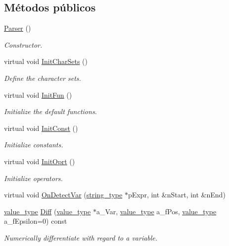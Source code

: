 \subsection*{Métodos públicos}
\begin{DoxyCompactItemize}
\item 
\hyperlink{classmu_1_1_parser_a76747bbf8c232e488e15f846e1b4ed34}{Parser} ()
\begin{DoxyCompactList}\small\item\em Constructor. \end{DoxyCompactList}\item 
virtual void \hyperlink{classmu_1_1_parser_a3279e2cf701ba8c2f850f5826a147f75}{Init\+Char\+Sets} ()
\begin{DoxyCompactList}\small\item\em Define the character sets. \end{DoxyCompactList}\item 
virtual void \hyperlink{classmu_1_1_parser_a9da582fd5385acfd97ec99a8790f8c6d}{Init\+Fun} ()
\begin{DoxyCompactList}\small\item\em Initialize the default functions. \end{DoxyCompactList}\item 
virtual void \hyperlink{classmu_1_1_parser_aefd1da7ba62d20d7276b1e70c8cb6a02}{Init\+Const} ()
\begin{DoxyCompactList}\small\item\em Initialize constants. \end{DoxyCompactList}\item 
virtual void \hyperlink{classmu_1_1_parser_a4ed9bdd0565bd57325bc49c12cf73e06}{Init\+Oprt} ()
\begin{DoxyCompactList}\small\item\em Initialize operators. \end{DoxyCompactList}\item 
virtual void \hyperlink{classmu_1_1_parser_a8e5afdde87b9f8acabde693441d4798c}{On\+Detect\+Var} (\hyperlink{namespacemu_ae9f8b44d9a97dd397180891e8390c3e9}{string\+\_\+type} $\ast$p\+Expr, int \&n\+Start, int \&n\+End)
\item 
\hyperlink{namespacemu_a17d4f113a4b88b8d971cca8ddbbe8a47}{value\+\_\+type} \hyperlink{classmu_1_1_parser_a46d01c86c2abc8d38674dce036e882a4}{Diff} (\hyperlink{namespacemu_a17d4f113a4b88b8d971cca8ddbbe8a47}{value\+\_\+type} $\ast$a\+\_\+\+Var, \hyperlink{namespacemu_a17d4f113a4b88b8d971cca8ddbbe8a47}{value\+\_\+type} a\+\_\+f\+Pos, \hyperlink{namespacemu_a17d4f113a4b88b8d971cca8ddbbe8a47}{value\+\_\+type} a\+\_\+f\+Epsilon=0) const 
\begin{DoxyCompactList}\small\item\em Numerically differentiate with regard to a variable. \end{DoxyCompactList}\end{DoxyCompactItemize}
